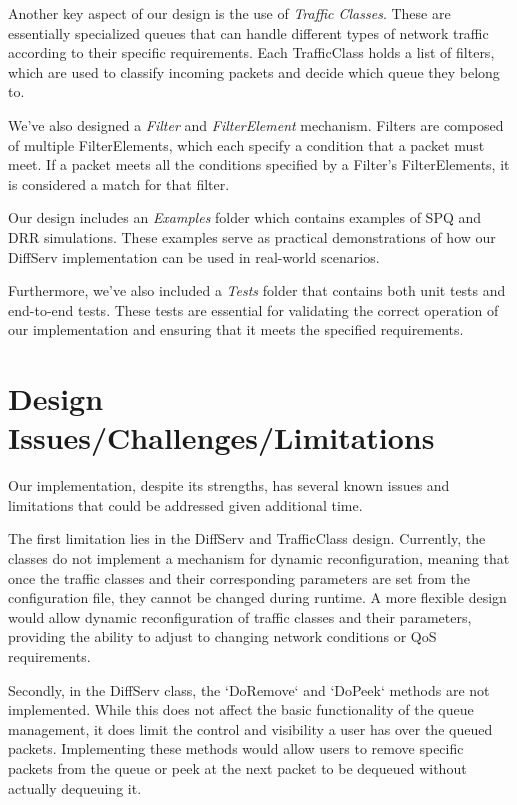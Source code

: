 \documentclass{article}
\begin{document}
Another key aspect of our design is the use of \textit{Traffic Classes}. These are essentially specialized queues that can handle different types of network traffic according to their specific requirements. Each TrafficClass holds a list of filters, which are used to classify incoming packets and decide which queue they belong to.

We've also designed a \textit{Filter} and \textit{FilterElement} mechanism. Filters are composed of multiple FilterElements, which each specify a condition that a packet must meet. If a packet meets all the conditions specified by a Filter's FilterElements, it is considered a match for that filter.

Our design includes an \textit{Examples} folder which contains examples of SPQ and DRR simulations. These examples serve as practical demonstrations of how our DiffServ implementation can be used in real-world scenarios. 

Furthermore, we've also included a \textit{Tests} folder that contains both unit tests and end-to-end tests. These tests are essential for validating the correct operation of our implementation and ensuring that it meets the specified requirements.


\section{Design Issues/Challenges/Limitations}

Our implementation, despite its strengths, has several known issues and limitations that could be addressed given additional time.

The first limitation lies in the DiffServ and TrafficClass design. Currently, the classes do not implement a mechanism for dynamic reconfiguration, meaning that once the traffic classes and their corresponding parameters are set from the configuration file, they cannot be changed during runtime. A more flexible design would allow dynamic reconfiguration of traffic classes and their parameters, providing the ability to adjust to changing network conditions or QoS requirements.

Secondly, in the DiffServ class, the `DoRemove` and `DoPeek` methods are not implemented. While this does not affect the basic functionality of the queue management, it does limit the control and visibility a user has over the queued packets. Implementing these methods would allow users to remove specific packets from the queue or peek at the next packet to be dequeued without actually dequeuing it.
\end{document}
